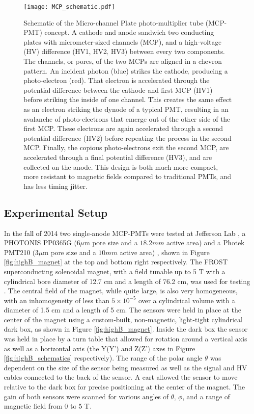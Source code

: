 \begin{figure}[!htb]
	\centering
	\texttt{[image: MCP\_schematic.pdf]}
	\caption[Schematic of the Micro-channel Plate photo-multiplier tube (MCP-PMT) concept.]{Schematic of the Micro-channel Plate photo-multiplier tube (MCP-PMT) concept. A cathode and anode sandwich two conducting plates with micrometer-sized channels (MCP), and a high-voltage (HV) difference (HV1, HV2, HV3) between every two components. The channels, or pores, of the two MCPs are aligned in a chevron pattern. An incident photon (blue) strikes the cathode, producing a photo-electron (red). That electron is accelerated through the potential difference between the cathode and first MCP (HV1) before striking the inside of one channel. This creates the same effect as an electron striking the dynode of a typical PMT, resulting in an avalanche of photo-electrons that emerge out of the other side of the first MCP. These electrons are again accelerated through a second potential difference (HV2) before repeating the process in the second MCP. Finally, the copious photo-electrons exit the second MCP, are accelerated through a final potential difference (HV3), and are collected on the anode. This design is both much more compact, more resistant to magnetic fields compared to traditional PMTs, and has less timing jitter. }
	\label{fig:MCP_schematic}
\end{figure}

\subsection{Experimental Setup}
In the fall of 2014 two single-anode MCP-PMTs were tested at Jefferson Lab \cite{HighB_DIRC2015}, a PHOTONIS PP0365G ($6 \mu\text{m}$ pore size and a $18.2 \unit{mm}$ active area) \cite{PHOTONIS} and a Photek PMT210 ($3 \mu\text{m}$ pore size and a $10 \unit{mm}$ active area)  \cite{Photek}, shown in Figure \ref{fig:highB_magnet} at the top and bottom right respectively. The FROST  superconducting solenoidal magnet, with a field tunable up to 5 T with a cylindrical bore diameter of 12.7 cm and a length of 76.2 cm, was used for testing \cite{JLab_FrozenTarget}. The central field of the magnet, while quite large, is also very homogeneous, with an inhomogeneity of less than $5\times10^{-5}$ over a cylindrical volume with a diameter of 1.5 cm and a length of 5 cm. The sensors were held in place at the center of the magnet using a custom-built, non-magnetic, light-tight cylindrical dark box, as shown in Figure \ref{fig:highB_magnet}. Inside the dark box the sensor was held in place by a turn table that allowed for rotation around a vertical axis as well as a horizontal axis (the Y(Y') and Z(Z') axes in Figure \ref{fig:highB_schematics} respectively). The range of the polar angle $\theta$ was dependent on the size of the sensor being measured as well as the signal and HV cables connected to the back of the sensor. A cart allowed the sensor to move relative to the dark box for precise positioning at the center of the magnet. The gain of both sensors were scanned for various angles of $\theta$, $\phi$, and a range of magnetic field from 0 to 5 T.

